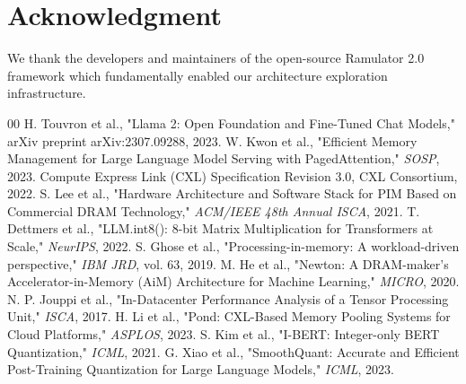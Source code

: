 \documentclass[10pt,conference]{IEEEtran}
\begin{document}
\section*{Acknowledgment}

We thank the developers and maintainers of the open-source Ramulator 2.0 framework which fundamentally enabled our architecture exploration infrastructure.


\begin{thebibliography}{00}
 H. Touvron et al., "Llama 2: Open Foundation and Fine-Tuned Chat Models," arXiv preprint arXiv:2307.09288, 2023.
 W. Kwon et al., "Efficient Memory Management for Large Language Model Serving with PagedAttention," \textit{SOSP}, 2023.
 Compute Express Link (CXL) Specification Revision 3.0, CXL Consortium, 2022.
 S. Lee et al., "Hardware Architecture and Software Stack for PIM Based on Commercial DRAM Technology," \textit{ACM/IEEE 48th Annual ISCA}, 2021.
 T. Dettmers et al., "LLM.int8(): 8-bit Matrix Multiplication for Transformers at Scale," \textit{NeurIPS}, 2022.
 S. Ghose et al., "Processing-in-memory: A workload-driven perspective," \textit{IBM JRD}, vol. 63, 2019.
 M. He et al., "Newton: A DRAM-maker's Accelerator-in-Memory (AiM) Architecture for Machine Learning," \textit{MICRO}, 2020.
 N. P. Jouppi et al., "In-Datacenter Performance Analysis of a Tensor Processing Unit," \textit{ISCA}, 2017.
 H. Li et al., "Pond: CXL-Based Memory Pooling Systems for Cloud Platforms," \textit{ASPLOS}, 2023.
 S. Kim et al., "I-BERT: Integer-only BERT Quantization," \textit{ICML}, 2021.
 G. Xiao et al., "SmoothQuant: Accurate and Efficient Post-Training Quantization for Large Language Models," \textit{ICML}, 2023.
\end{thebibliography}
\end{document}
